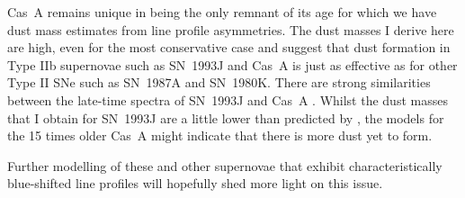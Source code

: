 Cas~A remains unique in being the only remnant of its age for which we have dust mass estimates from line profile asymmetries.  The dust masses I derive here are high, even for the most conservative case and suggest that dust formation in Type IIb supernovae such as SN~1993J and Cas~A is just as effective as for other Type II SNe such as SN~1987A and SN~1980K.  There are strong similarities between the late-time spectra of SN~1993J and Cas~A \citep{Milisavljevic2012}.  Whilst the dust masses that I obtain for SN~1993J are a little lower than predicted by \citet{Gall2014}, the models for the 15 times older Cas~A might indicate that there is more dust yet to form.

Further modelling of these and other supernovae that exhibit characteristically blue-shifted line profiles will hopefully shed more light on this issue.

